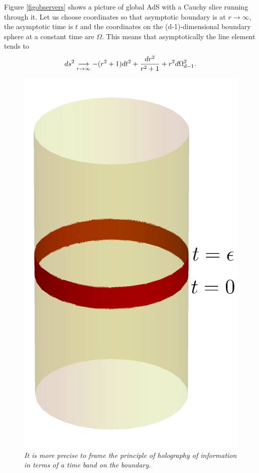 \documentclass[12pt]{article}
\newcommand{\be}{\begin{equation}}
\newcommand{\ee}{\end{equation}}
\begin{document}
Figure \ref{figobservers} shows a picture of global AdS with a Cauchy slice running through it. Let us choose coordinates so that asymptotic boundary is at $r \rightarrow \infty$, the asymptotic time is $t$ and the coordinates on the (d-1)-dimensional boundary sphere at a constant time are $\Omega$. This means that asymptotically the line element tends to
\be
ds^2 \underset{r \rightarrow \infty}{\longrightarrow} -(r^2 + 1) dt^2 + {d r^2 \over r^2 + 1} + r^2 d \Omega_{d-1}^2.
\ee


\begin{figure}[!ht]
\begin{center}
\includegraphics[height=0.4\textheight]{cylinderband.pdf}
\caption{\em  It is more precise to frame the principle of holography of information in terms of a time band on the boundary. \label{figband}}
\end{center}
\end{figure}
\end{document}
